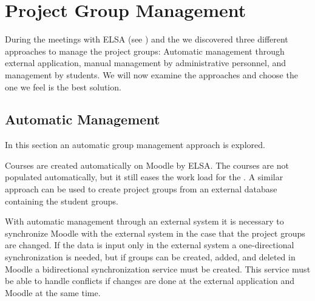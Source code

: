 \section{Project Group Management}
\label{sec:groupManagement}
\label{sec:projectgroupadministration}
During the meetings with ELSA (see ) and the \admpers{} we discovered three different approaches to manage the project groups: Automatic management through external application, manual management by administrative personnel, and management by students. 
We will now examine the approaches and choose the one we feel is the best solution.


\subsection{Automatic Management}
\label{sub:automanagement}
In this section an automatic group management approach is explored.  

Courses are created automatically on Moodle by ELSA.
The courses are not populated automatically, but it still eases the work load for the \admpers{}.  
A similar approach can be used to create project groups from an external database containing the student groups. 

With automatic management through an external system it is necessary to synchronize Moodle with the external system in the case that the project groups are changed. 
If the data is input only in the external system a one-directional synchronization is needed, but if groups can be created, added, and deleted in Moodle a bidirectional synchronization service must be created. 
This service must be able to handle conflicts if changes are done at the external application and Moodle at the same time.

